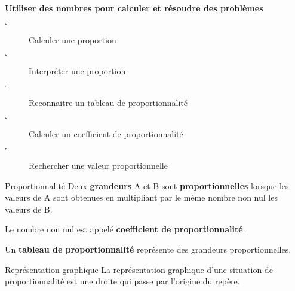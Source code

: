 \begin{titre}[La proportionnalité]

\end{titre}


\begin{CpsCol}
\textbf{Utiliser des nombres pour calculer et résoudre des problèmes}
\begin{description}
\item[$\square$] Calculer une proportion
\item[$\square$] Interpréter une proportion
\item[$\square$] Reconnaitre un tableau de proportionnalité
\item[$\square$] Calculer un coefficient de proportionnalité
\item[$\square$] Rechercher une valeur proportionnelle
\end{description}
\end{CpsCol}



\begin{DefT}{Proportionnalité }
Deux \textbf{grandeurs} A et B sont  \textbf{proportionnelles} lorsque les valeurs de A sont obtenues en multipliant par le même nombre non nul les valeurs de B.

Le nombre non nul est appelé \textbf{coefficient de proportionnalité}.

Un \textbf{tableau de proportionnalité} représente des grandeurs proportionnelles.
\end{DefT}


\begin{DefT}{Représentation graphique}
La représentation graphique d'une situation de proportionnalité est une droite qui passe par l'origine du repère.
\end{DefT}